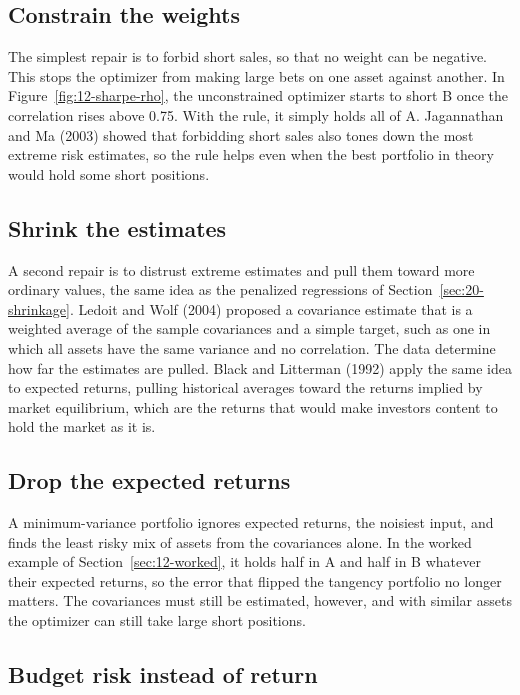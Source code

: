\subsection{Constrain the weights}

The simplest repair is to forbid short sales, so that no weight can be negative. This stops the optimizer from making large bets on one asset against another. In Figure~\ref{fig:12-sharpe-rho}, the unconstrained optimizer starts to short B once the correlation rises above 0.75. With the rule, it simply holds all of A. Jagannathan and Ma (2003) showed that forbidding short sales also tones down the most extreme risk estimates, so the rule helps even when the best portfolio in theory would hold some short positions.

\subsection{Shrink the estimates}

A second repair is to distrust extreme estimates and pull them toward more ordinary values, the same idea as the penalized regressions of Section~\ref{sec:20-shrinkage}. Ledoit and Wolf (2004) proposed a covariance estimate that is a weighted average of the sample covariances and a simple target, such as one in which all assets have the same variance and no correlation. The data determine how far the estimates are pulled. Black and Litterman (1992) apply the same idea to expected returns, pulling historical averages toward the returns implied by market equilibrium, which are the returns that would make investors content to hold the market as it is.

\subsection{Drop the expected returns}

A minimum-variance portfolio ignores expected returns, the noisiest input, and finds the least risky mix of assets from the covariances alone. In the worked example of Section~\ref{sec:12-worked}, it holds half in A and half in B whatever their expected returns, so the error that flipped the tangency portfolio no longer matters. The covariances must still be estimated, however, and with similar assets the optimizer can still take large short positions.

\subsection{Budget risk instead of return}

